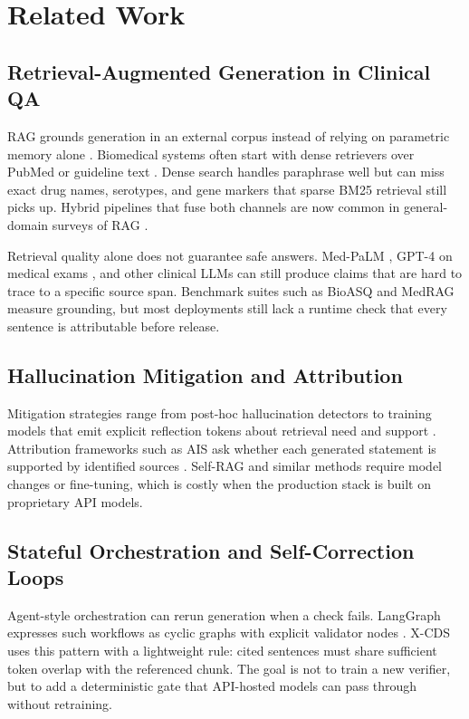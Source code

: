 \section{Related Work}\label{sec:related_work}

\subsection{Retrieval-Augmented Generation in Clinical QA}
RAG grounds generation in an external corpus instead of relying on parametric memory alone \citep{lewis2020retrieval}. Biomedical systems often start with dense retrievers over PubMed or guideline text \citep{lee2020biobert,huang2019clinicalbert}. Dense search handles paraphrase well but can miss exact drug names, serotypes, and gene markers that sparse BM25 retrieval still picks up. Hybrid pipelines that fuse both channels are now common in general-domain surveys of RAG \citep{gao2023retrieval}.

Retrieval quality alone does not guarantee safe answers. Med-PaLM \citep{singhal2023large}, GPT-4 on medical exams \citep{nori2023capabilities}, and other clinical LLMs can still produce claims that are hard to trace to a specific source span. Benchmark suites such as BioASQ \citep{tsatsaronis2015overview} and MedRAG \citep{xiong2024medrag} measure grounding, but most deployments still lack a runtime check that every sentence is attributable before release.

\subsection{Hallucination Mitigation and Attribution}
Mitigation strategies range from post-hoc hallucination detectors \citep{manakul2023selfcheckgpt} to training models that emit explicit reflection tokens about retrieval need and support \citep{asai2024selfrag}. Attribution frameworks such as AIS ask whether each generated statement is supported by identified sources \citep{rashkin2023measuring}. Self-RAG and similar methods require model changes or fine-tuning, which is costly when the production stack is built on proprietary API models.

\subsection{Stateful Orchestration and Self-Correction Loops}
Agent-style orchestration can rerun generation when a check fails. LangGraph expresses such workflows as cyclic graphs with explicit validator nodes \citep{langgraph2024}. X-CDS uses this pattern with a lightweight rule: cited sentences must share sufficient token overlap with the referenced chunk. The goal is not to train a new verifier, but to add a deterministic gate that API-hosted models can pass through without retraining.

